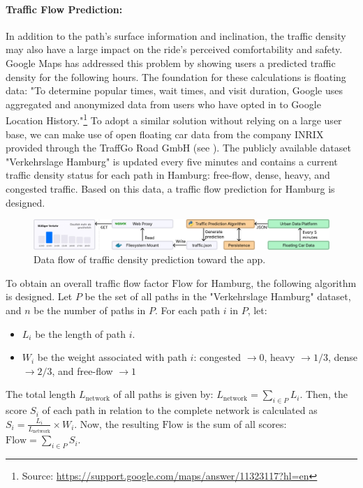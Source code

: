 \paragraph{Traffic Flow Prediction:} In addition to the path's surface information and inclination, the traffic density may also have a large impact on the ride's perceived comfortability and safety. Google Maps has addressed this problem by showing users a predicted traffic density for the following hours. The foundation for these calculations is floating data: "To determine popular times, wait times, and visit duration, Google uses aggregated and anonymized data from users who have opted in to Google Location History."\footnote{Source: \url{https://support.google.com/maps/answer/11323117?hl=en}} To adopt a similar solution without relying on a large user base, we can make use of open floating car data from the company INRIX provided through the TraffGo Road GmbH (see ). The publicly available dataset "Verkehrslage Hamburg" is updated every five minutes and contains a current traffic density status for each path in Hamburg: free-flow, dense, heavy, and congested traffic. Based on this data, a traffic flow prediction for Hamburg is designed.

\begin{figure}[htbp]
\centering
\includegraphics[width=\linewidth]{images/traffic-density-prediction.pdf}
\caption{Data flow of traffic density prediction toward the app.}
\label{fig:traffic-density-prediction}
\end{figure}

To obtain an overall traffic flow factor $\text{Flow}$ for Hamburg, the following algorithm is designed. Let $P$ be the set of all paths in the "Verkehrslage Hamburg" dataset, and $n$ be the number of paths in $P$. For each path $i$ in $P$, let:

\begin{itemize}
    \item $L_i$ be the length of path $i$.
    \item $W_i$ be the weight associated with path $i$: congested $\rightarrow 0$, heavy $\rightarrow 1/3$, dense $\rightarrow 2/3$, and free-flow $\rightarrow 1$
\end{itemize}

The total length $L_\text{network}$ of all paths is given by: $L_\text{network} = \sum_{i \in P} L_i$. Then, the score $S_i$ of each path in relation to the complete network is calculated as $S_i = \frac{L_i}{L_\text{network}} \times W_i$. Now, the resulting $\text{Flow}$ is the sum of all scores: $\text{Flow} = \sum_{i \in P} S_i$. 


